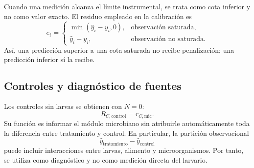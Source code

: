 Cuando una medición alcanza el límite instrumental, se trata como cota
inferior y no como valor exacto. El residuo empleado en la calibración
es
\[
e_i=
\begin{cases}
\min(\widehat y_i-y_i,0),&\text{observación saturada},\\
\widehat y_i-y_i,&\text{observación no saturada}.
\end{cases}
\]
Así, una predicción superior a una cota saturada no recibe penalización;
una predicción inferior sí la recibe.

\subsection{Controles y diagnóstico de fuentes}

Los controles sin larvas se obtienen con $N=0$:
\[
R_{C,\mathrm{control}}=r_{C,\mathrm{mic}}.
\]
Su función es informar el módulo microbiano sin atribuirle
automáticamente toda la diferencia entre tratamiento y control. En
particular, la partición observacional
\[
\widehat y_{\mathrm{tratamiento}}
-\widehat y_{\mathrm{control}}
\]
puede incluir interacciones entre larvas, alimento y microorganismos.
Por tanto, se utiliza como diagnóstico y no como medición directa del
\co{} larvario.
